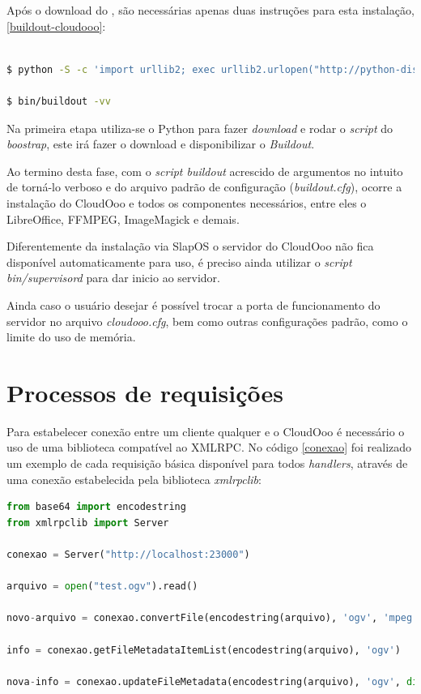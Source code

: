 Após o download do \cite{BUILD-CLOUDOOO}, são necessárias apenas duas instruções para esta instalação, \ref{buildout-cloudooo}:

{\singlespace
\begin{lstlisting}[caption=Modo de instalação do cloudOoo \cite{BUILD-CLOUDOOO},language=bash,label={buildout-cloudooo}]

$ python -S -c 'import urllib2; exec urllib2.urlopen("http://python-distribute.org/boostrap.py").read()'

$ bin/buildout -vv

\end{lstlisting}
}

Na primeira etapa utiliza-se o Python para fazer \textit{download} e rodar o \textit{script} do \textit{boostrap}, este irá fazer o download e disponibilizar o \textit{Buildout}. 

Ao termino desta fase, com o \textit{script buildout} acrescido de argumentos no intuito de torná-lo verboso e do arquivo padrão de configuração (\textit{buildout.cfg}), ocorre a instalação do CloudOoo e todos os componentes necessários, entre eles o LibreOffice, FFMPEG, ImageMagick e demais.

Diferentemente da instalação via SlapOS o servidor do CloudOoo não fica disponível automaticamente para uso, é preciso ainda utilizar o \textit{script bin/supervisord} para dar inicio ao servidor.

Ainda caso o usuário desejar é possível trocar a porta de funcionamento do servidor no arquivo \textit{cloudooo.cfg}, bem como outras configurações padrão, como o limite do uso de memória.


\section{Processos de requisições}

Para estabelecer conexão entre um cliente qualquer e o CloudOoo é necessário o uso de uma biblioteca compatível ao XMLRPC. No código \ref{conexao} foi realizado um exemplo de cada requisição básica disponível para todos \textit{handlers}, através de uma conexão estabelecida pela biblioteca \textit{xmlrpclib}:

{\singlespace
\begin{lstlisting}[caption=Exemplo prático de uso do CloudOoo,language=python,label={conexao}]
from base64 import encodestring
from xmlrpclib import Server

conexao = Server("http://localhost:23000")

arquivo = open("test.ogv").read()

novo-arquivo = conexao.convertFile(encodestring(arquivo), 'ogv', 'mpeg')

info = conexao.getFileMetadataItemList(encodestring(arquivo), 'ogv')

nova-info = conexao.updateFileMetadata(encodestring(arquivo), 'ogv', dict(Titulo="Arquivo teste"))

\end{lstlisting}
}

